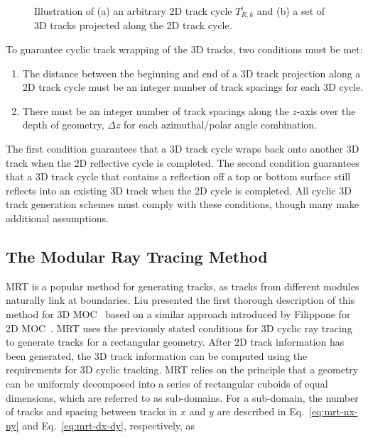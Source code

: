 \begin{figure}[h!]
\begin{subfigure}{0.45\textwidth}
		\caption{}
		\label{fig:projected-tracks-b}
	\end{subfigure}
	\caption[]{Illustration of (a) an arbitrary 2D track cycle $T_{R,k}^{i}$ and (b) a set of 3D tracks projected along the 2D track cycle.}
	\label{fig:projected-tracks}
\end{figure}


To guarantee cyclic track wrapping of the 3D tracks, two conditions must be met:

\begin{enumerate}
	\item The distance between the beginning and end of a 3D track projection along a 2D track cycle must be an integer number of track spacings for each 3D cycle.
	\item There must be an integer number of track spacings along the $z$-axis over the depth of geometry, $\Delta z$ for each azimuthal/polar angle combination.
\end{enumerate}

The first condition guarantees that a 3D track cycle wraps back onto another 3D track when the 2D reflective cycle is completed. The second condition guarantees that a 3D track cycle that contains a reflection off a top or bottom surface still reflects into an existing 3D track when the 2D cycle is completed. All cyclic 3D track generation schemes must comply with these conditions, though many make additional assumptions.

\subsection{The Modular Ray Tracing Method}

\ac{MRT} is a popular method for generating tracks, as tracks from different modules naturally link at boundaries. Liu presented the first thorough description of this method for 3D \ac{MOC}~\cite{liu_mrt} based on a similar approach introduced by Filippone for 2D \ac{MOC}~\cite{orig-moc-rt}. \ac{MRT} uses the previously stated conditions for 3D cyclic ray tracing to generate tracks for a rectangular geometry. After 2D track information has been generated, the 3D track information can be computed using the requirements for 3D cyclic tracking. \ac{MRT} relies on the principle that a geometry can be uniformly decomposed into a series of rectangular cuboids of equal dimensions, which are referred to as sub-domains. For a sub-domain, the number of tracks and spacing between tracks in $x$ and $y$ are described in Eq.~\ref{eq:mrt-nx-ny} and Eq.~\ref{eq:mrt-dx-dy}, respectively, as

